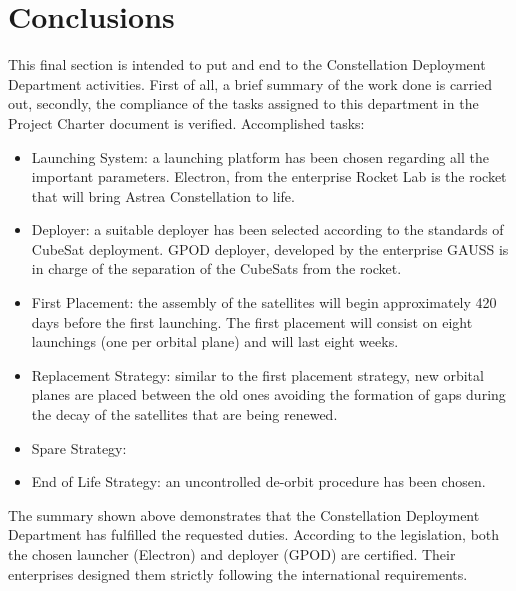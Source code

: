 \section{Conclusions}
This final section is intended to put and end to the Constellation Deployment Department activities. First of all, a brief summary of the work done is carried out, secondly, the compliance of the tasks assigned to this department in the Project Charter document is verified. 
Accomplished tasks: 
\begin{itemize}
\item Launching System: a launching platform has been chosen regarding all the important parameters. Electron, from the enterprise Rocket Lab is the rocket that will bring Astrea Constellation to life. 
\item Deployer: a suitable deployer has been selected according to the standards of CubeSat deployment. GPOD deployer, developed by the enterprise GAUSS is in charge of the separation of the CubeSats from the rocket. 
\item First Placement: the assembly of the satellites will begin approximately 420 days before the first launching. The first placement will consist on eight launchings (one per orbital plane) and will last eight weeks. 
\item Replacement Strategy: similar to the first placement strategy, new orbital planes are placed between the old ones avoiding the formation of gaps during the decay of the satellites that are being renewed.
\item Spare Strategy:
\item End of Life Strategy: an uncontrolled de-orbit procedure has been chosen. 
\end{itemize}
The summary shown above demonstrates that the Constellation Deployment Department has fulfilled the requested duties. According to the legislation, both the chosen launcher (Electron) and deployer (GPOD) are certified. Their enterprises designed them strictly following the international requirements. 

